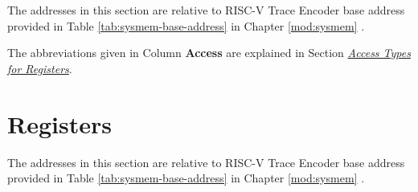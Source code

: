 \documentclass[main\_\_EN.tex]{subfiles}
\begin{document}
The addresses in this section are relative to RISC-V Trace Encoder base address provided in Table \ref{tab:sysmem-base-address} in Chapter \ref{mod:sysmem} \textit{}.

The abbreviations given in Column \textbf{Access} are explained in Section \hyperref[glossary-access-types]{\textit{Access Types for Registers}}.






\clearpage
\section{Registers}

The addresses in this section are relative to RISC-V Trace Encoder base address provided in Table \ref{tab:sysmem-base-address} in Chapter \ref{mod:sysmem} \textit{}.


\end{document}
